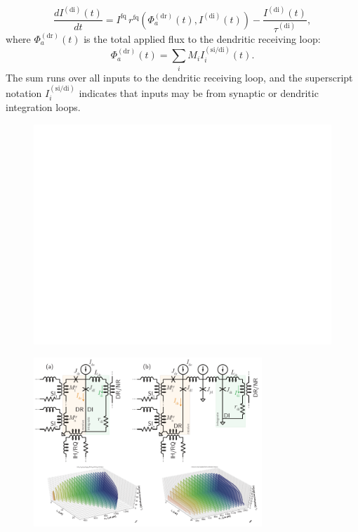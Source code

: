 \documentclass[twocolumn]{article}
\begin{document}
\begin{equation}
\label{eq:dendrites__leaky_integrator}
\frac{dI^{(\mathrm{di})}(t)}{dt} = I^{\mathrm{fq}}\,r^{\mathrm{fq}} \left( \Phi^{(\mathrm{dr})}_a(t),I^{(\mathrm{di})}(t) \right) - \frac{I^{(\mathrm{di})}(t)}{\tau^{(\mathrm{di})}},
\end{equation}
where $\Phi^{(\mathrm{dr})}_a(t)$ is the total applied flux to the dendritic receiving loop:
\begin{equation}
\label{eq:dendrites__applied_flux}
\Phi^{(\mathrm{dr})}_a(t) = \sum_i M_i I_i^{(\mathrm{si/di})}(t).
\end{equation}
The sum runs over all inputs to the dendritic receiving loop, and the superscript notation $I_i^{(\mathrm{si/di})}$ indicates that inputs may be from synaptic or dendritic integration loops.

\begin{figure}[h!]
\includegraphics[width=17.2cm]{figures/_fig__dendrites__circuits_responses.pdf}
\end{figure}

\begin{figure}[h!]
\includegraphics[width=8.6cm]{figures/_fig__dendrites__comparison.pdf}
\end{figure}
\end{document}
